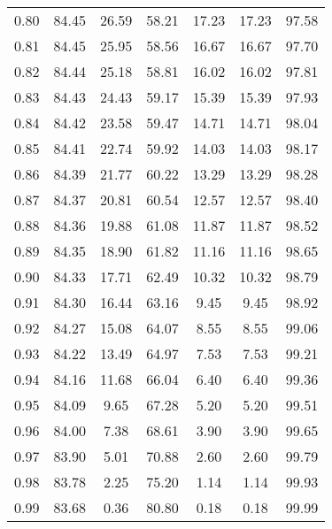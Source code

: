 \begin{tabular}{|c|c|c|c|c|c|c|}
      0.80 &     84.45 &     26.59 &      58.21 &   17.23 &      17.23 &         97.58 \\
      0.81 &     84.45 &     25.95 &      58.56 &   16.67 &      16.67 &         97.70 \\
      0.82 &     84.44 &     25.18 &      58.81 &   16.02 &      16.02 &         97.81 \\
      0.83 &     84.43 &     24.43 &      59.17 &   15.39 &      15.39 &         97.93 \\
      0.84 &     84.42 &     23.58 &      59.47 &   14.71 &      14.71 &         98.04 \\
      0.85 &     84.41 &     22.74 &      59.92 &   14.03 &      14.03 &         98.17 \\
      0.86 &     84.39 &     21.77 &      60.22 &   13.29 &      13.29 &         98.28 \\
      0.87 &     84.37 &     20.81 &      60.54 &   12.57 &      12.57 &         98.40 \\
      0.88 &     84.36 &     19.88 &      61.08 &   11.87 &      11.87 &         98.52 \\
      0.89 &     84.35 &     18.90 &      61.82 &   11.16 &      11.16 &         98.65 \\
      0.90 &     84.33 &     17.71 &      62.49 &   10.32 &      10.32 &         98.79 \\
      0.91 &     84.30 &     16.44 &      63.16 &    9.45 &       9.45 &         98.92 \\
      0.92 &     84.27 &     15.08 &      64.07 &    8.55 &       8.55 &         99.06 \\
      0.93 &     84.22 &     13.49 &      64.97 &    7.53 &       7.53 &         99.21 \\
      0.94 &     84.16 &     11.68 &      66.04 &    6.40 &       6.40 &         99.36 \\
      0.95 &     84.09 &      9.65 &      67.28 &    5.20 &       5.20 &         99.51 \\
      0.96 &     84.00 &      7.38 &      68.61 &    3.90 &       3.90 &         99.65 \\
      0.97 &     83.90 &      5.01 &      70.88 &    2.60 &       2.60 &         99.79 \\
      0.98 &     83.78 &      2.25 &      75.20 &    1.14 &       1.14 &         99.93 \\
      0.99 &     83.68 &      0.36 &      80.80 &    0.18 &       0.18 &         99.99 \\
\bottomrule
\end{tabular}
